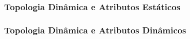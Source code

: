 \subsubsection{Topologia Dinâmica e Atributos Estáticos}

\subsubsection{Topologia Dinâmica e Atributos Dinâmicos}



























